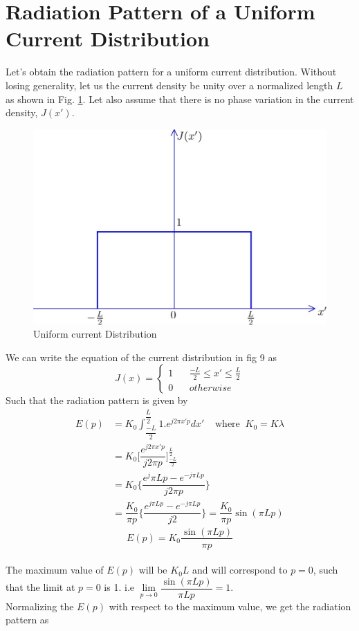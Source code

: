 \section{Radiation Pattern of a Uniform Current Distribution}
Let's obtain the radiation pattern for a uniform current distribution. Without losing generality, let us the current density be unity over a normalized length $L$ as shown in Fig. \ref{fig9}. Let also assume that there is no phase variation in the current density, $J(x')$.
\begin{figure}[h]
\centering
\includegraphics[width=1\linewidth]{./graphics/n9}
\caption{Uniform current Distribution}
\label{fig9}
\end{figure}

We can write the equation of the current distribution in fig 9 as
\begin{equation*}
J(x) =
\begin{cases}
1 \ \ \ \ & \frac{-L}{2}\le x' \le \frac{L}{2} \\
0  & otherwise
\end{cases}
\end{equation*}
Such that the radiation pattern is given by 
\begin{align*}
E(p) &= K_0\int_{\dfrac{-L}{2}}^{\dfrac{L}{2}} 1.e^{j2\pi x'p }dx' \; \; \; \;\text{where}\; \;  K_0 = K\lambda\\ %
&= K_0\bigg[\dfrac{e^{j2\pi x'p}}{j2\pi p}\bigg]_{\frac{-L}{2}}^{ \frac{L}{2}}\\	  
&= K_0 \bigg\{\dfrac{ e{^j\pi Lp}- e^{-j\pi Lp}}{j2\pi p}\bigg\}\\
& = \dfrac{K_0}{\pi p}\bigg\{\dfrac{ e^{j\pi Lp} -  e^{-j\pi Lp}}{j2}\bigg\} = \dfrac{K_0}{\pi p}\sin(\pi Lp)
\end{align*}
$$E(p) = K_0 \dfrac{\sin (\pi Lp)}{\pi p}$$\\
The maximum value of $E(p)$ will be $K_0L$ and will correspond to $ p = 0$, such that the limit at $p = 0$ is 1. i.e $\lim\limits_{p\rightarrow0} \dfrac{\sin(\pi Lp)}{\pi Lp} = 1$.\\
Normalizing the $E(p)$ with respect to the maximum value, we get the radiation pattern as

